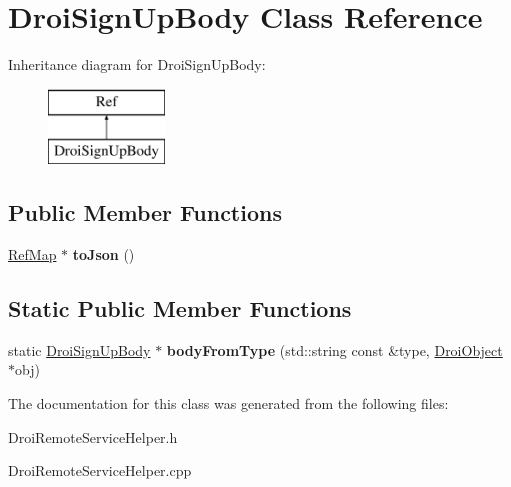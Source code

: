 \hypertarget{class_droi_sign_up_body}{}\section{Droi\+Sign\+Up\+Body Class Reference}
\label{class_droi_sign_up_body}
Inheritance diagram for Droi\+Sign\+Up\+Body\+:\begin{figure}[H]
\begin{center}
\leavevmode
\includegraphics[height=2.000000cm]{de/d8d/class_droi_sign_up_body}
\end{center}
\end{figure}
\subsection*{Public Member Functions}
\begin{DoxyCompactItemize}
\item 
\mbox{\label{class_droi_sign_up_body_ab16aa4d24876aa737498d1faf66047f3}} 
\hyperlink{class_ref_map}{Ref\+Map} $\ast$ {\bfseries to\+Json} ()
\end{DoxyCompactItemize}
\subsection*{Static Public Member Functions}
\begin{DoxyCompactItemize}
\item 
\mbox{\label{class_droi_sign_up_body_ad3e95f65942cb8cde4dbd90855c83551}} 
static \hyperlink{class_droi_sign_up_body}{Droi\+Sign\+Up\+Body} $\ast$ {\bfseries body\+From\+Type} (std\+::string const \&type, \hyperlink{class_droi_object}{Droi\+Object} $\ast$obj)
\end{DoxyCompactItemize}


The documentation for this class was generated from the following files\+:\begin{DoxyCompactItemize}
\item 
Droi\+Remote\+Service\+Helper.\+h\item 
Droi\+Remote\+Service\+Helper.\+cpp\end{DoxyCompactItemize}
